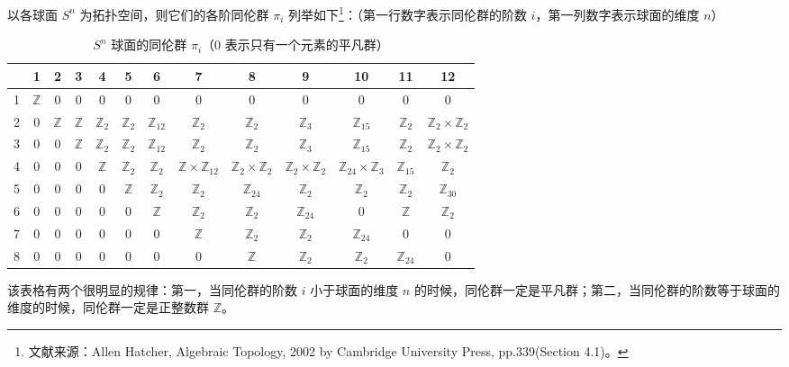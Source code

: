 

以各球面 $S^n$ 为拓扑空间，则它们的各阶同伦群 $\pi_i$ 列举如下\footnote{文献来源：Allen Hatcher, Algebraic Topology, 2002 by Cambridge University Press, pp.339(Section 4.1)。}：（第一行数字表示同伦群的阶数 $i$，第一列数字表示球面的维度 $n$）

\begin{table}[ht]
\caption{$S^n$ 球面的同伦群 $\pi_i$（$0$ 表示只有一个元素的平凡群）}\label{tab_SphHmt_1}
\begin{tabular}{|c|c|c|c|c|c|c|c|c|c|c|c|c|}
\hline
 & 1 & 2 & 3 & 4 & 5 & 6 & 7 & 8 & 9 & 10 & 11 & 12 \\
\hline
1 & $\mathbb{Z}$ & 0 & 0 & 0 & 0 & 0 & 0 & 0 & 0 & 0 & 0 & 0 \\
\hline
2 & 0 & $\mathbb{Z}$ & $\mathbb{Z}$ & $\mathbb{Z}_2$ & $\mathbb{Z}_2$ & $\mathbb{Z}_{12}$ & $\mathbb{Z}_2$ & $\mathbb{Z}_2$ & $\mathbb{Z}_3$ & $\mathbb{Z}_{15}$ & $\mathbb{Z}_2$ & $\mathbb{Z}_2\times\mathbb{Z}_2$\\
\hline
3 & 0 & 0 & $\mathbb{Z}$ & $\mathbb{Z}_2$ & $\mathbb{Z}_2$ & $\mathbb{Z}_{12}$ & $\mathbb{Z}_2$ & $\mathbb{Z}_2$ & $\mathbb{Z}_3$ & $\mathbb{Z}_{15}$ & $\mathbb{Z}_2$ & $\mathbb{Z}_2\times\mathbb{Z}_2$ \\
\hline
4 & 0 & 0 & 0 & $\mathbb{Z}$ & $\mathbb{Z}_2$ & $\mathbb{Z}_2$ & $\mathbb{Z}\times\mathbb{Z}_{12}$ & $\mathbb{Z}_2\times\mathbb{Z}_2$ & $\mathbb{Z}_2\times\mathbb{Z}_2$ & $\mathbb{Z}_{24}\times\mathbb{Z}_3$ & $\mathbb{Z}_{15}$ & $\mathbb{Z}_2$ \\
\hline
5 & 0 & 0 & 0 & 0 & $\mathbb{Z}$ & $\mathbb{Z}_2$ & $\mathbb{Z}_2$ & $\mathbb{Z}_{24}$ & $\mathbb{Z}_2$ & $\mathbb{Z}_2$ & $\mathbb{Z}_2$ & $\mathbb{Z}_{30}$ \\
\hline
6 & 0 & 0 & 0 & 0 & 0 & $\mathbb{Z}$ & $\mathbb{Z}_2$ & $\mathbb{Z}_2$ & $\mathbb{Z}_{24}$ & 0 & $\mathbb{Z}$ & $\mathbb{Z}_2$ \\
\hline
7 & 0 & 0 & 0 & 0 & 0 & 0 & $\mathbb{Z}$ & $\mathbb{Z}_2$ & $\mathbb{Z}_2$ & $\mathbb{Z}_{24}$ & 0 & 0 \\
\hline
8 & 0 & 0 & 0 & 0 & 0 & 0 & 0 & $\mathbb{Z}$ & $\mathbb{Z}_2$ & $\mathbb{Z}_2$ & $\mathbb{Z}_{24}$ & 0 \\
\hline
\end{tabular}
\end{table}

该表格有两个很明显的规律：第一，当同伦群的阶数 $i$ 小于球面的维度 $n$ 的时候，同伦群一定是平凡群；第二，当同伦群的阶数等于球面的维度的时候，同伦群一定是正整数群 $\mathbb{Z}$。
